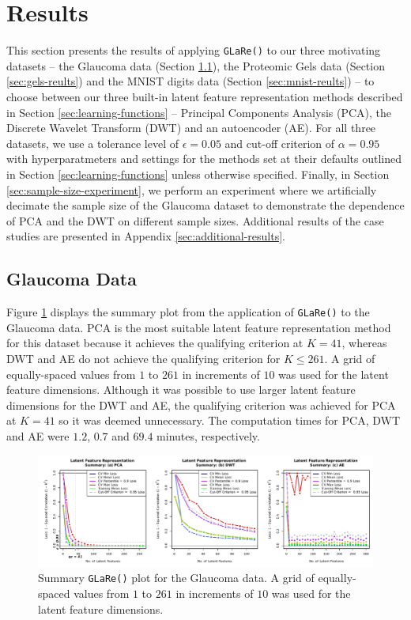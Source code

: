 \section{Results}\label{sec:results}

This section presents the results of applying \texttt{GLaRe()} to our three motivating datasets --  the Glaucoma data (Section \ref{sec:glaucoma-reults}), the Proteomic Gels data (Section \ref{sec:gels-reults}) and the MNIST digits data (Section \ref{sec:mnist-reults}) -- to choose between our three built-in latent feature representation methods described in Section \ref{sec:learning-functions} -- Principal Components Analysis (PCA), the Discrete Wavelet Transform (DWT) and an autoencoder (AE).
For all three datasets, we use a tolerance level of $\epsilon = 0.05$ and cut-off criterion of $\alpha=0.95$ with hyperparatmeters and settings for the methods set at their defaults outlined in Section \ref{sec:learning-functions} unless otherwise specified.
Finally, in Section \ref{sec:sample-size-experiment}, we perform an experiment where we artificially decimate the sample size of the Glaucoma dataset to demonstrate the dependence of PCA and the DWT on different sample sizes.
Additional results of the case studies are presented in Appendix \ref{sec:additional-results}.

\subsection{Glaucoma Data}\label{sec:glaucoma-reults}

Figure \ref{fig:eye-results} displays the summary plot from the application of \texttt{GLaRe()} to the Glaucoma data.
PCA is the most suitable latent feature representation method for this dataset because it achieves the qualifying criterion at $K=41$, whereas DWT and AE do not achieve the qualifying criterion for $K \leq 261$.
A grid of equally-spaced values from $1$ to $261$ in increments of $10$ was used for the latent feature dimensions.
Although it was possible to use larger latent feature dimensions for the DWT and AE, the qualifying criterion was achieved for PCA at $K=41$ so it was deemed unnecessary.
The computation times for PCA, DWT and AE were $1.2$, $0.7$ and $69.4$ minutes, respectively.

\begin{figure}
    \centering
    \includegraphics[width=1\textwidth]{figures/eye-results.pdf}
    \caption{Summary \texttt{GLaRe()} plot for the Glaucoma data. A grid of equally-spaced values from $1$ to $261$ in increments of $10$ was used for the latent feature dimensions.}
    \label{fig:eye-results}
\end{figure}

